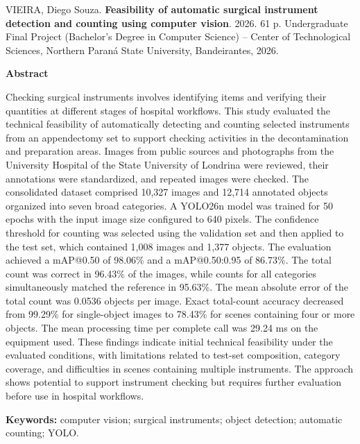 \thispagestyle{empty}
\normalfont\normalsize
\onehalfspacing
VIEIRA, Diego Souza. \textbf{Feasibility of automatic surgical instrument detection and counting using computer vision}. 2026. 61 p. Undergraduate Final Project (Bachelor's Degree in Computer Science) -- Center of Technological Sciences,
Northern Paraná State University, Bandeirantes, 2026.
\vspace{8pt}

\centering \textbf{Abstract}
\vspace{24pt}

\raggedright
Checking surgical instruments involves identifying items and verifying their quantities at different stages of hospital workflows. This study evaluated the technical feasibility of automatically detecting and counting selected instruments from an appendectomy set to support checking activities in the decontamination and preparation areas. Images from public sources and photographs from the University Hospital of the State University of Londrina were reviewed, their annotations were standardized, and repeated images were checked. The consolidated dataset comprised 10,327 images and 12,714 annotated objects organized into seven broad categories. A YOLO26n model was trained for 50 epochs with the input image size configured to 640 pixels. The confidence threshold for counting was selected using the validation set and then applied to the test set, which contained 1,008 images and 1,377 objects. The evaluation achieved a mAP@0.50 of 98.06\% and a mAP@0.50:0.95 of 86.73\%. The total count was correct in 96.43\% of the images, while counts for all categories simultaneously matched the reference in 95.63\%. The mean absolute error of the total count was 0.0536 objects per image. Exact total-count accuracy decreased from 99.29\% for single-object images to 78.43\% for scenes containing four or more objects. The mean processing time per complete call was 29.24 ms on the equipment used. These findings indicate initial technical feasibility under the evaluated conditions, with limitations related to test-set composition, category coverage, and difficulties in scenes containing multiple instruments. The approach shows potential to support instrument checking but requires further evaluation before use in hospital workflows.
\vspace{8pt}

\noindent\textbf{Keywords:} computer vision; surgical instruments; object detection; automatic counting; YOLO.
